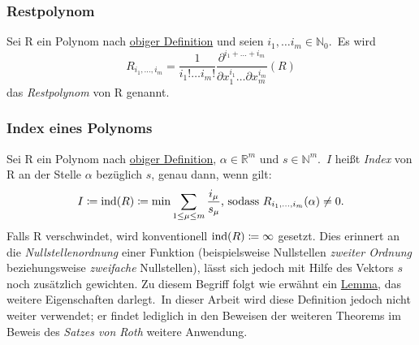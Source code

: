    \subsubsection{Restpolynom}
        \label{subsubsec:def-rempoly}
        Sei R ein Polynom nach \hyperref[subsubsec:def-poly]{obiger Definition} und seien $i_1, \dots i_m \in
        \mathbb{N}_0$.\ Es wird
        \begin{equation}
            R_{i_1, \dots, i_m} = \frac{1}{i_1! \dots i_m!} \frac{\partial^{i_1 + \dots + i_m}}{
                \partial x_1^{i_1} \dots \partial x_m^{i_m}} (R) \label{eq:def-rempoly}
        \end{equation}
        das \emph{Restpolynom} von R genannt.
    
    \subsubsection{Index eines Polynoms}
        \label{subsubsec:def-index}
        \textrm{Sei R ein Polynom nach \hyperref[subsubsec:def-poly]{obiger Definition}, $\alpha \in \mathbb{R}^m$
            und $s \in \mathbb{N}^m$.\ $I$ heißt \emph{Index} von R an der Stelle $\alpha$ bezüglich $s$, genau dann,
            wenn gilt:}
        \begin{equation}
            I \coloneq \operatorname{ind}(R) \coloneq \min \sum_{1 \leq \mu \leq m} \frac{i_\mu}{s_\mu} \text{, sodass} \
            R_{i_1, \dots, i_m}(\alpha) \neq 0. \label{eq:def-index}
        \end{equation}
        Falls R verschwindet, wird konventionell $\operatorname{ind}(R) \coloneq \infty$ gesetzt.
        \newline
        \textrm{Dies erinnert an die \emph{Nullstellenordnung} einer Funktion (beispielsweise Nullstellen
        \emph{zweiter Ordnung} beziehungsweise \emph{zweifache} Nullstellen), lässt sich jedoch mit Hilfe des
        Vektors $s$ noch zusätzlich gewichten.
        \newline
        Zu diesem Begriff folgt wie erwähnt ein \hyperref[subsec:lemma2]{Lemma}, das weitere Eigenschaften
        darlegt.\ In dieser Arbeit wird diese Definition jedoch nicht weiter verwendet; er findet lediglich in
        den Beweisen der weiteren Theorems im Beweis des \emph{Satzes von Roth} weitere Anwendung.}
    
